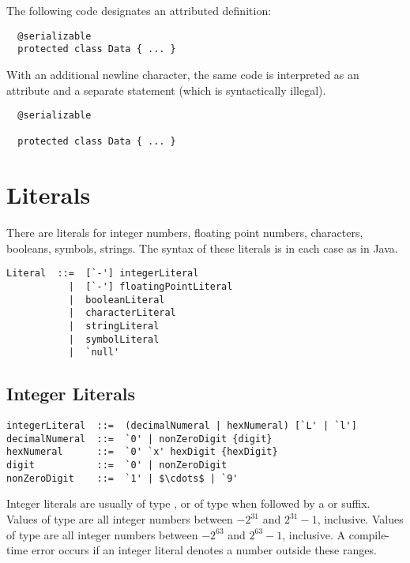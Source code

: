 \example The following code designates an attributed definition:

\begin{lstlisting}
  @serializable
  protected class Data { ... }
\end{lstlisting}

With an additional newline character, the same code is interpreted as
an attribute and a separate statement (which is syntactically
illegal).

\begin{lstlisting}
  @serializable

  protected class Data { ... }
\end{lstlisting}


\section{Literals}\label{sec:literals}

There are literals for integer numbers, floating point numbers,
characters, booleans, symbols, strings.  The syntax of these literals is in
each case as in Java.


\syntax\begin{lstlisting}
Literal  ::=  [`-'] integerLiteral
           |  [`-'] floatingPointLiteral
           |  booleanLiteral
           |  characterLiteral
           |  stringLiteral
           |  symbolLiteral
           |  `null'
\end{lstlisting}

\subsection{Integer Literals}

\syntax\begin{lstlisting}
integerLiteral  ::=  (decimalNumeral | hexNumeral) [`L' | `l']
decimalNumeral  ::=  `0' | nonZeroDigit {digit}
hexNumeral      ::=  `0' `x' hexDigit {hexDigit}
digit           ::=  `0' | nonZeroDigit
nonZeroDigit    ::=  `1' | $\cdots$ | `9'
\end{lstlisting}
Integer literals are usually of type \lstinline@Int@, or of type
\lstinline@Long@ when followed by a \lstinline@L@ or
\lstinline@l@ suffix. Values of type \lstinline@Int@ are all integer
numbers between $-2^{31}$ and $2^{31}-1$, inclusive.  Values of
type \lstinline@Long@ are all integer numbers between $-2^{63}$ and
$2^{63}-1$, inclusive. A compile-time error occurs if an integer literal
denotes a number outside these ranges.

